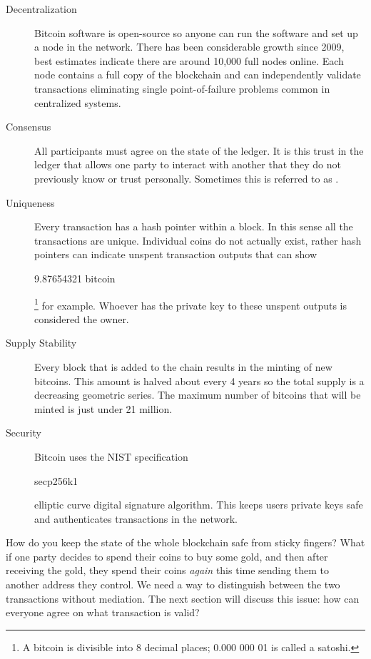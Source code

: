 \begin{description}
	\item [Decentralization] Bitcoin software is open-source so anyone can run the software and set up a node in the network. There has been considerable growth since 2009, best estimates indicate there are around 10,000 full nodes online. Each node contains a full copy of the blockchain and can independently validate transactions eliminating single point-of-failure problems common in centralized systems.
	\item[Consensus] All participants must agree on the state of the ledger. It is this trust in the ledger that allows one party to interact with another that they do not previously know or trust personally. Sometimes this is referred to as .
	\item [Uniqueness] Every transaction has a hash pointer within a block. In this sense all the transactions are unique. Individual coins do not actually exist, rather hash pointers can indicate unspent transaction outputs that can show \begin{code}9.87654321 bitcoin\end{code}\footnote{A bitcoin is divisible into 8 decimal places; 0.000 000 01 is called a satoshi.} for example. Whoever has the private key to these unspent outputs is considered the owner.
	\item [Supply Stability] Every block that is added to the chain results in the minting of new bitcoins. This amount is halved about every 4 years so the total supply is a decreasing geometric series. The maximum number of bitcoins that will be minted is just under 21 million.
	\item [Security] Bitcoin uses the NIST specification \begin{code}secp256k1\end{code} elliptic curve digital signature algorithm. This keeps users private keys safe and authenticates transactions in the network.
 
\end{description}
How do you keep the state of the whole blockchain safe from sticky fingers? What if one party decides to spend their coins to buy some gold, and then after receiving the gold, they spend their coins \textit{again} this time sending them to another address they control. We need a way to distinguish between the two transactions without mediation. The next section will discuss this issue: how can everyone agree on what transaction is valid?

